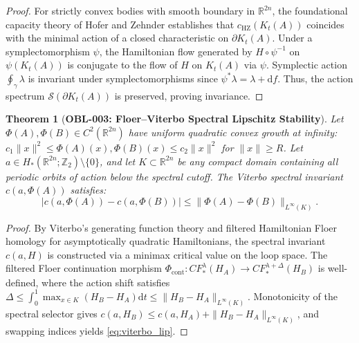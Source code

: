 \documentclass[11pt,a4paper,reqno]{amsart}
\newtheorem{theorem}{Theorem}[section]
\theoremstyle{definition}
\theoremstyle{remark}
\numberwithin{equation}{section}
\newcommand{\dif}{\mathrm{d}}
\begin{document}
\begin{proof}
For strictly convex bodies with smooth boundary in $\mathbb{R}^{2n}$, the foundational capacity theory of Hofer and Zehnder \cite{HoferZehnder1994} establishes that $c_{\mathrm{HZ}}(K_t(A))$ coincides with the minimal action of a closed characteristic on $\partial K_t(A)$. Under a symplectomorphism $\psi$, the Hamiltonian flow generated by $H \circ \psi^{-1}$ on $\psi(K_t(A))$ is conjugate to the flow of $H$ on $K_t(A)$ via $\psi$. Symplectic action $\oint_\gamma \lambda$ is invariant under symplectomorphisms since $\psi^* \lambda = \lambda + \dif f$. Thus, the action spectrum $\mathcal{S}(\partial K_t(A))$ is preserved, proving invariance.
\end{proof}

\begin{theorem}[\textbf{OBL-003: Floer--Viterbo Spectral Lipschitz Stability}]
\label{thm:viterbo_lipschitz}
Let $\Phi(A), \Phi(B) \in C^2(\mathbb{R}^{2n})$ have uniform quadratic convex growth at infinity: $c_1 \|x\|^2 \le \Phi(A)(x), \Phi(B)(x) \le c_2 \|x\|^2$ for $\|x\| \ge R$. Let $a \in H_*(\mathbb{R}^{2n}; \mathbb{Z}_2) \setminus \{0\}$, and let $K \subset \mathbb{R}^{2n}$ be any compact domain containing all periodic orbits of action below the spectral cutoff. The Viterbo spectral invariant $c(a, \Phi(A))$ satisfies:
\begin{equation}
\label{eq:viterbo_lip}
\left| c(a, \Phi(A)) - c(a, \Phi(B)) \right| \le \|\Phi(A) - \Phi(B)\|_{L^\infty(K)}.
\end{equation}
\end{theorem}

\begin{proof}
By Viterbo's generating function theory \cite{Viterbo1992} and filtered Hamiltonian Floer homology for asymptotically quadratic Hamiltonians, the spectral invariant $c(a, H)$ is constructed via a minimax critical value on the loop space. The filtered Floer continuation morphism $\Phi_{\mathrm{cont}} \colon CF_*^{\lambda}(H_A) \to CF_*^{\lambda + \Delta}(H_B)$ is well-defined, where the action shift satisfies $\Delta \le \int_0^1 \max_{x \in K} (H_B - H_A) \dif t \le \|H_B - H_A\|_{L^\infty(K)}$. Monotonicity of the spectral selector gives $c(a, H_B) \le c(a, H_A) + \|H_B - H_A\|_{L^\infty(K)}$, and swapping indices yields \eqref{eq:viterbo_lip}.
\end{proof}

\end{document}

